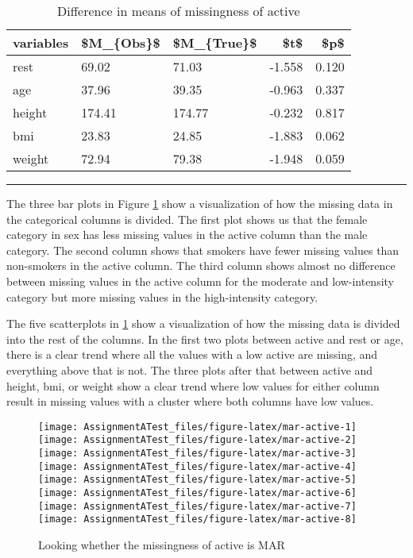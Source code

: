 \documentclass[
]{article}
\begin{document}
\begin{table}

\caption{\label{tab:missA}Difference in means of missingness of active}
\centering
\begin{tabular}[t]{l|l|l|r|r}
\hline
variables & \$M\_\{Obs\}\$ & \$M\_\{True\}\$ & \$t\$ & \$p\$\\
\hline
rest & 69.02 & 71.03 & -1.558 & 0.120\\
\hline
age & 37.96 & 39.35 & -0.963 & 0.337\\
\hline
height & 174.41 & 174.77 & -0.232 & 0.817\\
\hline
bmi & 23.83 & 24.85 & -1.883 & 0.062\\
\hline
weight & 72.94 & 79.38 & -1.948 & 0.059\\
\hline
\end{tabular}
\end{table}

\begin{center}\rule{0.5\linewidth}{0.5pt}\end{center}

The three bar plots in Figure \ref{fig:mar-active} show a visualization of how the missing data in the categorical columns is divided. The first plot shows us that the female category in sex has less missing values in the active column than the male category. The second column shows that smokers have fewer missing values than non-smokers in the active column. The third column shows almost no difference between missing values in the active column for the moderate and low-intensity category but more missing values in the high-intensity category.

The five scatterplots in \ref{fig:mar-active} show a visualization of how the missing data is divided into the rest of the columns. In the first two plots between active and rest or age, there is a clear trend where all the values with a low active are missing, and everything above that is not. The three plots after that between active and height, bmi, or weight show a clear trend where low values for either column result in missing values with a cluster where both columns have low values.

\begin{figure}
\texttt{[image: AssignmentATest\_files/figure-latex/mar-active-1]} \texttt{[image: AssignmentATest\_files/figure-latex/mar-active-2]} \texttt{[image: AssignmentATest\_files/figure-latex/mar-active-3]} \texttt{[image: AssignmentATest\_files/figure-latex/mar-active-4]} \texttt{[image: AssignmentATest\_files/figure-latex/mar-active-5]} \texttt{[image: AssignmentATest\_files/figure-latex/mar-active-6]} \texttt{[image: AssignmentATest\_files/figure-latex/mar-active-7]} \texttt{[image: AssignmentATest\_files/figure-latex/mar-active-8]} \caption{Looking whether the missingness of active is MAR}\label{fig:mar-active}
\end{figure}
\end{document}
